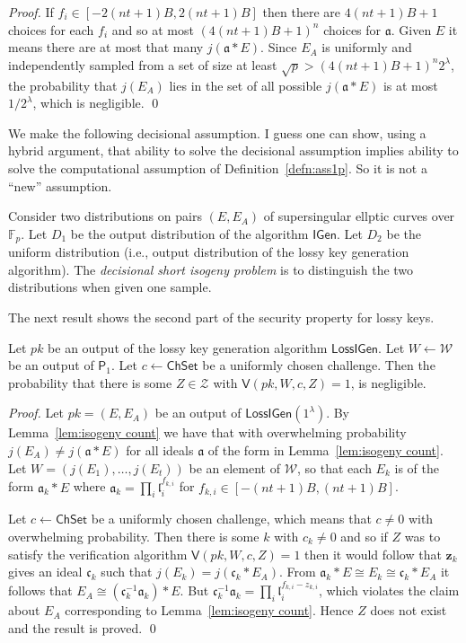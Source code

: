\documentclass{llncs}
\newcommand{\F}{\mathbb{F}}
\renewcommand{\a}{\mathfrak{a}}
\renewcommand{\c}{\mathfrak{c}}
\renewcommand{\l}{\mathfrak{l}}
\newcommand{\z}{\textbf{z}}
\newcommand{\IGen}{\textsf{IGen}}
\newcommand{\PP}{\textsf{P}}
\newcommand{\VV}{\textsf{V}}
\newcommand{\Wset}{\mathcal{W}}
\newcommand{\Zset}{\mathcal{Z}}
\newcommand{\ChSet}{\textsf{ChSet}}
\newcommand{\LossIGen}{\textsf{LossIGen}}
\begin{document}
\begin{proof}
If $f_i \in [-2(nt+1)B,2(nt+1)B]$ then there are $4(nt+1)B + 1$ choices for each $f_i$ and so at most $(4 (nt+1)B + 1)^{n}$ choices for $\a$.
Given $E$ it means there are at most that many $j( \a * E )$. Since $E_A$ is uniformly and independently sampled from a set of size at least $\sqrt{p} > (4 (nt+1)B + 1)^{n} 2^\lambda$, the probability that $j(E_A)$ lies in the set of all possible $j( \a * E )$ is at most $1/2^\lambda$, which is negligible. \qed
\end{proof}

We make the following decisional assumption.
I guess one can show, using a hybrid argument, that ability to solve the decisional assumption implies ability to solve the computational assumption of Definition~\ref{defn:ass1p}. So it is not a ``new'' assumption.

\begin{definition}
Consider two distributions on pairs $(E, E_A)$ of supersingular ellptic curves over $\F_p$.
Let $D_1$ be the output distribution of the algorithm $\IGen$.
Let $D_2$ be the uniform distribution (i.e., output distribution of the lossy key generation algorithm).
The \emph{decisional short isogeny problem} is to distinguish the two distributions when given one sample.
\end{definition}

The next result shows the second part of the security property for lossy keys.

\begin{lemma}
Let $pk$ be an output of the lossy key generation algorithm $\LossIGen$.
Let $W \leftarrow \Wset$ be an output of $\PP_1$.
Let $c \leftarrow \ChSet$ be a uniformly chosen challenge.
Then the probability that there is some $Z \in \Zset$ with $\VV( pk, W, c, Z ) = 1$, is negligible.
\end{lemma}

\begin{proof}
Let $pk = (E, E_A )$ be an output of $\LossIGen( 1^\lambda )$.
By Lemma~\ref{lem:isogeny count} we have that with overwhelming probability $j(E_A) \ne j( \a * E )$ for all ideals $\a$ of the form in Lemma~\ref{lem:isogeny count}.
Let $W = (j(E_1), \dots, j(E_t) )$ be an element of $\Wset$, so that each $E_k$ is of the form $\a_k * E$ where $\a_k = \prod_i \l_i^{f_{k,i}}$ for $f_{k,i} \in [-(nt+1)B, (nt+1)B ]$.


Let $c \leftarrow \ChSet$ be a uniformly chosen challenge, which means that $c \ne 0$ with overwhelming probability.
Then there is some $k$ with $c_k \ne 0$ and so if $Z$ was to satisfy the verification algorithm
$\VV( pk, W, c, Z ) = 1$ then it would follow that $\z_k$ gives an ideal $\c_k$ such that $j(E_k) = j( \c_k * E_A )$.
From $\a_k * E  \cong E_k \cong \c_k * E_A$ it follows that $E_A \cong (\c_k^{-1} \a_k ) * E$.
But $\c_k^{-1} \a_k = \prod_i \l_i^{f_{k,i} - z_{k,i}}$, which violates the claim about $E_A$ corresponding to Lemma~\ref{lem:isogeny count}. Hence $Z$ does not exist and the result is proved. \qed
\end{proof}
\end{document}
